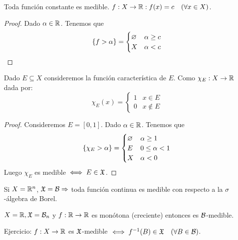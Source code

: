 \begin{eg}
    Toda función constante es medible. $f: X \to \mathbb{R} : f(x) = c \quad (\forall x \in X)$.
    \begin{proof}
        Dado $\alpha \in \mathbb{R}$. Tenemos que \begin{equation*}
            \{ f > \alpha \} = \begin{cases}
                \varnothing & \alpha \geq c \\
                X  & \alpha < c
            \end{cases}
        \end{equation*}
    \end{proof}
\end{eg}

\begin{eg}
    Dado $E \subseteq X$ consideremos la función característica de $E$. Como $\chi_E: X \to \mathbb{R}$ dada por:
    \begin{equation*}
        \chi_E(x) = \begin{cases}
            1 & x \in E    \\
            0 & x \notin E
        \end{cases}
    \end{equation*}
    \begin{proof}
        Consideremos $E = [0, 1]$. Dado $\alpha \in \mathbb{R}$. Tenemos que \begin{equation*}
            \{ \chi_E > \alpha \} = \begin{cases}
                \varnothing & \alpha \geq 1     \\
                E  & 0 \leq \alpha < 1 \\
                X  & \alpha < 0
            \end{cases}
        \end{equation*}
        Luego $\chi_E$ es medible $\iff E \in \mathfrak{X}$.
    \end{proof}
\end{eg}

\begin{eg}
    Si $X = \mathbb{R}^n$, $\mathfrak{X} = \mathcal{B} \Rightarrow$ toda función continua es medible con respecto a la $\sigma$-álgebra de Borel.
\end{eg}

\begin{eg}
    $X = \mathbb{R}, \mathfrak{X} = \mathcal{B}_n$ y $f: \mathbb{R} \to \mathbb{R}$ es monótona (creciente) entonces es $\mathcal{B}$-medible.
\end{eg}

Ejercicio: $f: X \to \mathbb{R}$ es $\mathfrak{X}$-medible $\iff f^{-1}(B) \in \mathfrak{X} \quad (\forall B \in \mathcal{B})$.

